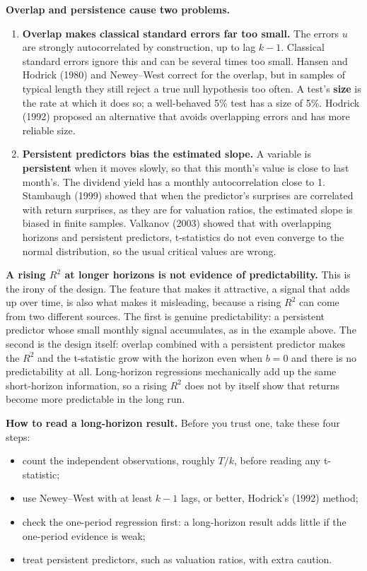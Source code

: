 \textbf{Overlap and persistence cause two problems.}

\begin{enumerate}
  \item \textbf{Overlap makes classical standard errors far too small.} The errors $u$ are strongly autocorrelated by construction, up to lag $k - 1$. Classical standard errors ignore this and can be several times too small. Hansen and Hodrick (1980) and Newey--West correct for the overlap, but in samples of typical length they still reject a true null hypothesis too often. A test's \textbf{size} is the rate at which it does so; a well-behaved 5\% test has a size of 5\%. Hodrick (1992) proposed an alternative that avoids overlapping errors and has more reliable size.
  \item \textbf{Persistent predictors bias the estimated slope.} A variable is \textbf{persistent} when it moves slowly, so that this month's value is close to last month's. The dividend yield has a monthly autocorrelation close to 1. Stambaugh (1999) showed that when the predictor's surprises are correlated with return surprises, as they are for valuation ratios, the estimated slope is biased in finite samples. Valkanov (2003) showed that with overlapping horizons and persistent predictors, t-statistics do not even converge to the normal distribution, so the usual critical values are wrong.
\end{enumerate}

\textbf{A rising $R^2$ at longer horizons is not evidence of predictability.} This is the irony of the design. The feature that makes it attractive, a signal that adds up over time, is also what makes it misleading, because a rising $R^2$ can come from two different sources. The first is genuine predictability: a persistent predictor whose small monthly signal accumulates, as in the example above. The second is the design itself: overlap combined with a persistent predictor makes the $R^2$ and the t-statistic grow with the horizon even when $b = 0$ and there is no predictability at all. Long-horizon regressions mechanically add up the same short-horizon information, so a rising $R^2$ does not by itself show that returns become more predictable in the long run.

\textbf{How to read a long-horizon result.} Before you trust one, take these four steps:

\begin{itemize}
  \item count the independent observations, roughly $T/k$, before reading any t-statistic;
  \item use Newey--West with at least $k-1$ lags, or better, Hodrick's (1992) method;
  \item check the one-period regression first: a long-horizon result adds little if the one-period evidence is weak;
  \item treat persistent predictors, such as valuation ratios, with extra caution.
\end{itemize}

